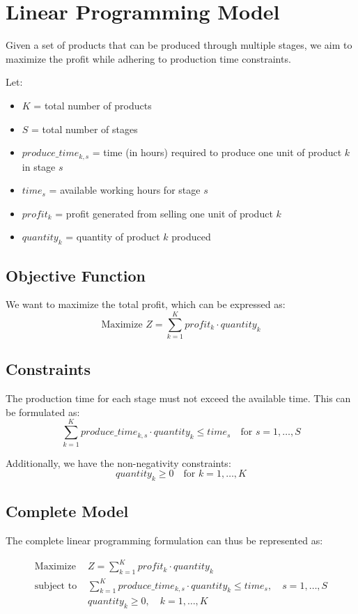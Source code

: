 \documentclass{article}
\begin{document}
\section*{Linear Programming Model}
Given a set of products that can be produced through multiple stages, we aim to maximize the profit while adhering to production time constraints. 

Let:
\begin{itemize}
    \item $K$ = total number of products
    \item $S$ = total number of stages
    \item $produce\_time_{k,s}$ = time (in hours) required to produce one unit of product $k$ in stage $s$
    \item $time_s$ = available working hours for stage $s$
    \item $profit_k$ = profit generated from selling one unit of product $k$
    \item $quantity_k$ = quantity of product $k$ produced
\end{itemize}

\subsection*{Objective Function}
We want to maximize the total profit, which can be expressed as:
\[
\text{Maximize } Z = \sum_{k=1}^{K} profit_k \cdot quantity_k
\]

\subsection*{Constraints}
The production time for each stage must not exceed the available time. This can be formulated as:
\[
\sum_{k=1}^{K} produce\_time_{k,s} \cdot quantity_k \leq time_s \quad \text{for } s = 1, \ldots, S
\]

Additionally, we have the non-negativity constraints:
\[
quantity_k \geq 0 \quad \text{for } k = 1, \ldots, K
\]

\subsection*{Complete Model}
The complete linear programming formulation can thus be represented as:

\[
\begin{align*}
\text{Maximize } & Z = \sum_{k=1}^{K} profit_k \cdot quantity_k \\
\text{subject to } & \sum_{k=1}^{K} produce\_time_{k,s} \cdot quantity_k \leq time_s, \quad s = 1, \ldots, S \\
& quantity_k \geq 0, \quad k = 1, \ldots, K
\end{align*}
\]
\end{document}
